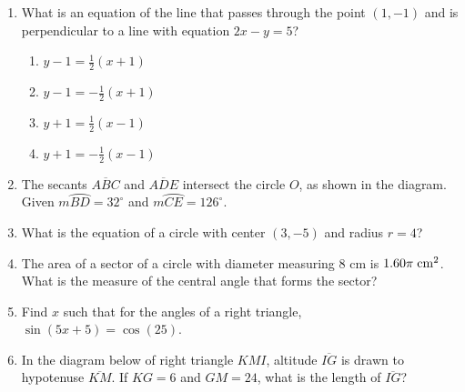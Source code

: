 \documentclass[12pt, oneside]{article}
\begin{document}
\begin{enumerate}[itemsep=1.2cm]
\item What is an equation of the line that passes through the point $(1,-1)$ and is perpendicular to a line with equation $2x-y=5$?
\begin{multicols}{2}
\begin{enumerate}
    \item $y-1=\frac{1}{2}(x+1)$
    \item $y-1=-\frac{1}{2}(x+1)$ 
    \item $y+1=\frac{1}{2}(x-1)$
    \item $y+1=-\frac{1}{2}(x-1)$
\end{enumerate}
\end{multicols}

\item The secants $\overline{ABC}$ and $\overline{ADE}$ intersect the circle $O$, as shown in the diagram. \\Given $m \wideparen{BD}=32^\circ$ and $m \wideparen{CE}=126^\circ$.
  \begin{center}
  \end{center}

\newpage
\item What is the equation of a circle with center $(3,-5)$ and radius $r=4$?

\item The area of a sector of a circle with diameter measuring 8 cm is $1.60\pi \; \rm{cm}^2$. What is the measure of the central angle that forms the sector?

\item Find $x$ such that for the angles of a right triangle, $\sin (5x + 5)=\cos (25)$.

\item In the diagram below of right triangle $KMI$, altitude $\overline{IG}$ is drawn to hypotenuse $\overline{KM}$. If $KG=6$ and $GM=24$, what is the length of $\overline{IG}$?
\begin{center}
\end{center}



\end{enumerate}
\end{document}
